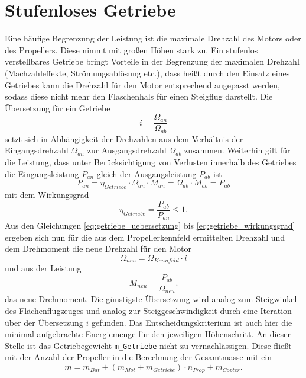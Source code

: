 \section{Stufenloses Getriebe}
\label{sec:getriebe}
Eine häufige Begrenzung der Leistung ist die maximale Drehzahl des Motors oder des Propellers. Diese nimmt mit großen Höhen stark zu. Ein stufenlos verstellbares Getriebe bringt Vorteile in der Begrenzung der maximalen Drehzahl (Machzahleffekte, Strömungsablösung etc.), dass heißt durch den Einsatz eines Getriebes kann die Drehzahl für den Motor entsprechend angepasst werden, sodass diese nicht mehr den Flaschenhals für einen Steigflug darstellt.
Die Übersetzung für ein Getriebe 
\begin{equation}
	i = \frac{\Omega_{an}}{\Omega_{ab}} 
	\label{eq:getriebe_uebersetzung}
\end{equation}
setzt sich in Abhängigkeit der Drehzahlen aus dem Verhältnis der Eingangsdrehzahl \ensuremath{\Omega_{an}} zur Ausgangsdrehzahl \ensuremath{\Omega_{ab}} zusammen. Weiterhin gilt für die Leistung, dass unter Berücksichtigung von Verlusten innerhalb des Getriebes die Eingangsleistung \ensuremath{P_{an}} gleich der Ausgangsleistung \ensuremath{P_{ab}} ist
\begin{equation}
	P_{an} = \eta_{Getriebe} \cdot \Omega_{an}\cdot M_{an} = \Omega_{ab}\cdot M_{ab} = P_{ab}
	\label{eq:getriebe_leistung}
\end{equation} 
mit dem Wirkungsgrad 
\begin{equation}
	\eta_{Getriebe} = \frac{P_{ab}}{P_{an}} \leq 1.
	\label{eq:getriebe_wirkungsgrad}
\end{equation}
Aus den Gleichungen \ref{eq:getriebe_uebersetzung} bis \ref{eq:getriebe_wirkungsgrad} ergeben sich nun für die aus dem Propellerkennfeld ermittelten Drehzahl und dem Drehmoment die neue Drehzahl für den Motor
\begin{equation}
	\Omega_{neu} = \Omega_{Kennfeld}\cdot i
\end{equation}
und aus der Leistung
\begin{equation}
	M_{neu} = \frac{P_{ab}}{\Omega_{neu}}.
\end{equation}
das neue Drehmoment.
Die günstigste Übersetzung wird analog zum Steigwinkel des Flächenflugzeuges und analog zur Steiggeschwindigkeit durch eine Iteration über der Übersetzung \ensuremath{i} gefunden. Das Entscheidungskriterium ist auch hier die minimal aufgebrachte Energiemenge für den jeweiligen Höhenschritt. An dieser Stelle ist das Getriebegewicht \texttt{m\_Getriebe} nicht zu vernachlässigen. Diese fließt mit der Anzahl der Propeller in die Berechnung der Gesamtmasse mit ein
\begin{equation}
	m = m_{Bat} + (m_{Mot} + m_{Getriebe})\cdot n_{Prop} + m_{Copter} .
\end{equation}


